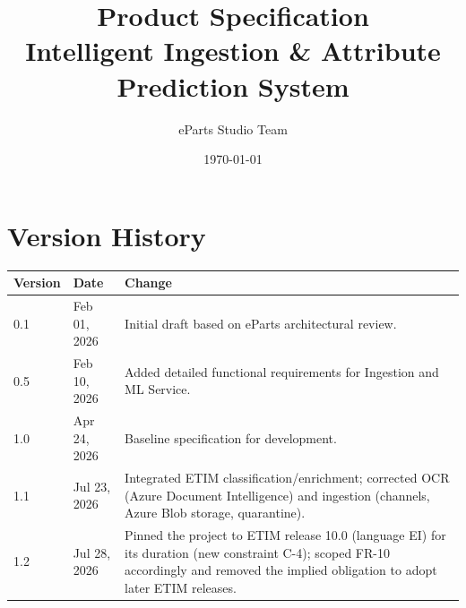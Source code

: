 \documentclass[12pt, a4paper]{article}
\title{Product Specification \\ \vspace{0.5cm} \Large Intelligent Ingestion \& Attribute Prediction System}
\author{eParts Studio Team}
\date{\today}
\begin{document}
\hypersetup{pageanchor=false}

\maketitle
\thispagestyle{empty}
\newpage

\pagestyle{fancy}
\hypersetup{pageanchor=true}
\setcounter{page}{1}
\tableofcontents
\newpage
{}

\section*{Version History}
\begin{tabular}{@{}llp{10cm}@{}}
\toprule
\textbf{Version} & \textbf{Date} & \textbf{Change} \\
\midrule
0.1 & Feb 01, 2026 & Initial draft based on eParts architectural review. \\
0.5 & Feb 10, 2026 & Added detailed functional requirements for Ingestion and ML Service. \\
1.0 & Apr 24, 2026 & Baseline specification for development. \\
1.1 & Jul 23, 2026 & Integrated ETIM classification/enrichment; corrected OCR (Azure Document Intelligence) and ingestion (channels, Azure Blob storage, quarantine). \\
1.2 & Jul 28, 2026 & Pinned the project to ETIM release 10.0 (language EI) for its duration (new constraint C-4); scoped FR-10 accordingly and removed the implied obligation to adopt later ETIM releases. \\
\bottomrule
\end{tabular}

\vspace{1cm}

\end{document}
